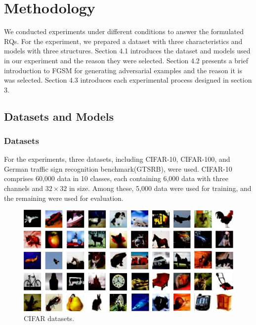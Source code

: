 \documentclass[journal,article,submit,moreauthors,pdftex]{Definitions/mdpi}
\begin{document}
\section{Methodology}

We conducted experiments under different conditions to answer the formulated RQs. For the experiment, we prepared a dataset with three characteristics and models with three structures.
Section 4.1 introduces the dataset and models used in our experiment and the reason they were selected.
Section 4.2 presents a brief introduction to FGSM for generating adversarial examples and the reason it is was selected.
Section 4.3 introduces each experimental process designed in section 3.

\subsection{Datasets and Models}

\subsubsection{Datasets}

For the experiments, three datasets, including CIFAR-10, CIFAR-100\cite{cifar}, and German traffic sign recognition benchmark(GTSRB)\cite{gtsrb}, were used.
CIFAR-10 comprises 60,000 data in 10 classes, each containing 6,000 data with three channels and \begin{math}{32\times 32}\end{math} in size.
Among these, 5,000 data were used for training, and the remaining were used for evaluation.

\begin{figure}[H] 
\includegraphics[width=13cm]{Definitions/cifar-datasets.png}
\caption{CIFAR datasets.\label{cifar-datasets}}
\end{figure} 
\end{document}
